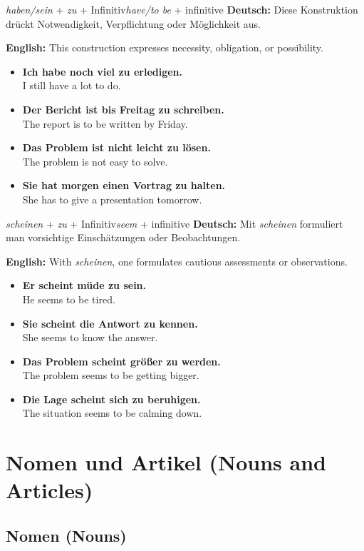 \documentclass[a4paper,11pt]{article}
\newcommand{\GermanText}[1]{\textbf{Deutsch: }#1\par}
\newcommand{\EnglishText}[1]{{\color{SoftGray}\textbf{English: }#1\par}}
\newcommand{\ExampleItem}[2]{\item \textbf{#1}\\{\color{SoftGray}#2}}
\begin{document}
\begin{grammarentry}{\textit{haben/sein} + \textit{zu} + Infinitiv}{\textit{have/to be} + infinitive}
    \GermanText{Diese Konstruktion drückt Notwendigkeit, Verpflichtung oder Möglichkeit aus.}
    \EnglishText{This construction expresses necessity, obligation, or possibility.}
    \begin{exbox}
        \begin{itemize}
            \ExampleItem{Ich habe noch viel zu erledigen.}{I still have a lot to do.}
            \ExampleItem{Der Bericht ist bis Freitag zu schreiben.}{The report is to be written by Friday.}
            \ExampleItem{Das Problem ist nicht leicht zu lösen.}{The problem is not easy to solve.}
            \ExampleItem{Sie hat morgen einen Vortrag zu halten.}{She has to give a presentation tomorrow.}
        \end{itemize}
    \end{exbox}
\end{grammarentry}

\begin{grammarentry}{\textit{scheinen} + \textit{zu} + Infinitiv}{\textit{seem} + infinitive}
    \GermanText{Mit \textit{scheinen} formuliert man vorsichtige Einschätzungen oder Beobachtungen.}
    \EnglishText{With \textit{scheinen}, one formulates cautious assessments or observations.}
    \begin{exbox}
        \begin{itemize}
            \ExampleItem{Er scheint müde zu sein.}{He seems to be tired.}
            \ExampleItem{Sie scheint die Antwort zu kennen.}{She seems to know the answer.}
            \ExampleItem{Das Problem scheint größer zu werden.}{The problem seems to be getting bigger.}
            \ExampleItem{Die Lage scheint sich zu beruhigen.}{The situation seems to be calming down.}
        \end{itemize}
    \end{exbox}
\end{grammarentry}

\section{Nomen und Artikel {\small (Nouns and Articles)}}

\subsection{Nomen {\small (Nouns)}}
\end{document}
